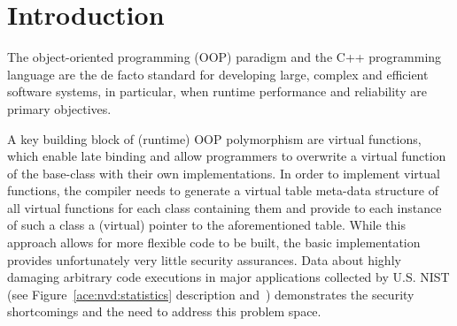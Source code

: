 \section{Introduction}
\label{chapter:Introduction}

The object-oriented programming (OOP) paradigm and the C++ programming language are the de facto standard for developing large, complex and efficient software systems, in particular, 
when runtime performance and reliability are primary objectives.

A key building block of (runtime) OOP polymorphism are virtual functions, which enable late binding and allow programmers to overwrite a virtual function of the base-class with their 
own implementations. In order to implement virtual functions, the compiler needs to generate a virtual table meta-data structure of all virtual functions for each class containing 
them and provide to each instance of such a class a (virtual) pointer to the aforementioned table. While this approach allows for more flexible code to be built, 
the basic implementation provides unfortunately very little security assurances. Data about highly damaging arbitrary code executions in major applications collected by U.S. NIST 
(see Figure~\ref{ace:nvd:statistics} description
and~\cite{NVD:ACE}) demonstrates the security shortcomings and the need to address this problem space.


